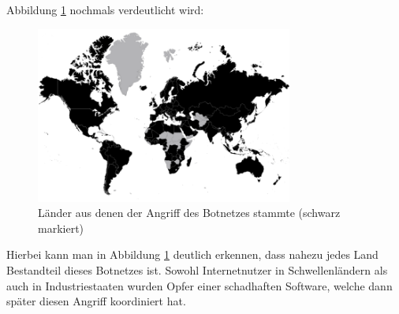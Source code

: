 Abbildung \ref{fig:botnetz-karte} nochmals verdeutlicht wird:\\
\begin{figure}[H]
	\centering
	\includegraphics[width=8.45cm]{img/botnetz-angriffe-karte-1920-1080.png}
	\caption{Länder aus denen der Angriff des Botnetzes stammte (schwarz markiert)}
	\label{fig:botnetz-karte}
\end{figure}
Hierbei kann man in Abbildung \ref{fig:botnetz-karte} deutlich erkennen, dass nahezu jedes Land Bestandteil dieses Botnetzes ist. Sowohl  Internetnutzer in Schwellenländern als auch in Industriestaaten wurden Opfer einer schadhaften Software, welche dann später diesen Angriff koordiniert hat.
